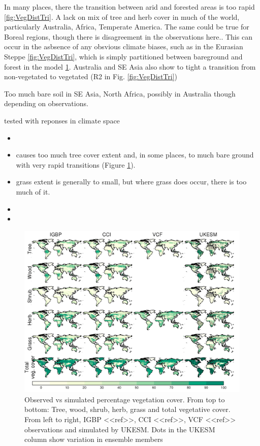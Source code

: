 \documentclass[bg, manuscript]{copernicus}
\begin{document}
In many places, there the transition between arid and forested areas is too rapid \ref{fig:VegDistTri}. A lack on mix of tree and herb cover in much of the world, particularly Australia, Africa, Temperate America. The same could be true for Boreal regions, though there is disagreement in the observations here.. This can occur in the asbsence of any obsvious climate biases, such as in the Eurasian Steppe \ref{fig:VegDistTri}, which is simply partitioned between bareground and forest in the model \ref{fig:VegDistMap}. Australia and SE Asia also show to tight a transition from non-vegetated to vegetated (R2 in Fig. \ref{fig:VegDistTri})

 Too much bare soil in SE Asia, North Africa, possibly in Australia though depending on observations. 


tested with reponses in climate space

\begin{itemize}
    \item 
    \item causes too much tree cover extent and, in some places, to much bare ground with very rapid transitions (Figure  \ref{fig:VegDistMap}).
    \item grass extent is generally to small, but where grass does occur, there is too much of it.
    \item 
    \item 
\end{itemize}


\begin{figure}[t]
\includegraphics[width=12cm]{figs/VegDist/vegDist.png}
\caption{Observed vs simulated percentage vegetation cover. From top to bottom: Tree, wood, shrub, herb, grass and total vegetative cover. From left to right, IGBP <<ref>>, CCI <<ref>>, VCF <<ref>> observations and simulated by UKESM. Dots in the UKESM column show variation in ensemble members \label{fig:VegDistMap}}
\end{figure}
\end{document}
